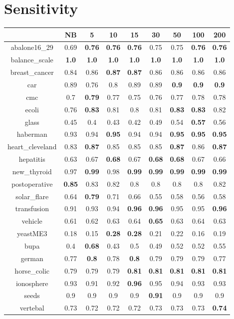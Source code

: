 \documentclass{article}%
\begin{document}
%
\section*{Sensitivity}%
\begin{tabular}{c|cccccccc}%
\hline%
&NB&5&10&15&30&50&100&200\\%
\hline%
abalone16\_29&0.69&\textbf{0.76}&\textbf{0.76}&\textbf{0.76}&0.75&0.75&\textbf{0.76}&\textbf{0.76}\\%
\hline%
balance\_scale&\textbf{1.0}&\textbf{1.0}&\textbf{1.0}&\textbf{1.0}&\textbf{1.0}&\textbf{1.0}&\textbf{1.0}&\textbf{1.0}\\%
\hline%
breast\_cancer&0.84&0.86&\textbf{0.87}&\textbf{0.87}&0.86&0.86&0.86&0.86\\%
\hline%
car&0.89&0.76&0.8&0.89&0.89&\textbf{0.9}&\textbf{0.9}&\textbf{0.9}\\%
\hline%
cmc&0.7&\textbf{0.79}&0.77&0.75&0.76&0.77&0.78&0.78\\%
\hline%
ecoli&0.76&\textbf{0.83}&0.81&0.8&0.81&\textbf{0.83}&\textbf{0.83}&0.82\\%
\hline%
glass&0.45&0.4&0.43&0.42&0.49&0.54&\textbf{0.57}&0.56\\%
\hline%
haberman&0.93&0.94&\textbf{0.95}&0.94&0.94&\textbf{0.95}&\textbf{0.95}&\textbf{0.95}\\%
\hline%
heart\_cleveland&0.83&\textbf{0.87}&0.85&0.85&0.85&\textbf{0.87}&0.86&\textbf{0.87}\\%
\hline%
hepatitis&0.63&0.67&\textbf{0.68}&0.67&\textbf{0.68}&\textbf{0.68}&0.67&0.66\\%
\hline%
new\_thyroid&0.97&\textbf{0.99}&0.98&\textbf{0.99}&\textbf{0.99}&\textbf{0.99}&\textbf{0.99}&\textbf{0.99}\\%
\hline%
postoperative&\textbf{0.85}&0.83&0.82&0.8&0.8&0.8&0.8&0.82\\%
\hline%
solar\_flare&0.64&\textbf{0.79}&0.71&0.66&0.55&0.58&0.56&0.58\\%
\hline%
transfusion&0.91&0.93&0.94&\textbf{0.96}&\textbf{0.96}&0.95&0.95&\textbf{0.96}\\%
\hline%
vehicle&0.61&0.62&0.63&0.64&\textbf{0.65}&0.63&0.64&0.63\\%
\hline%
yeastME3&0.18&0.15&\textbf{0.28}&\textbf{0.28}&0.21&0.22&0.16&0.19\\%
\hline%
bupa&0.4&\textbf{0.68}&0.43&0.5&0.49&0.52&0.52&0.55\\%
\hline%
german&0.77&\textbf{0.8}&0.78&\textbf{0.8}&0.79&0.79&0.79&0.77\\%
\hline%
horse\_colic&0.79&0.79&0.79&\textbf{0.81}&\textbf{0.81}&\textbf{0.81}&\textbf{0.81}&\textbf{0.81}\\%
\hline%
ionosphere&0.93&0.91&0.92&\textbf{0.96}&0.95&0.94&0.93&0.93\\%
\hline%
seeds&0.9&0.9&0.9&0.9&\textbf{0.91}&0.9&0.9&0.9\\%
\hline%
vertebal&0.73&0.72&0.72&0.72&0.73&0.73&0.73&\textbf{0.74}\\%
\hline%
\end{tabular}
\end{document}
